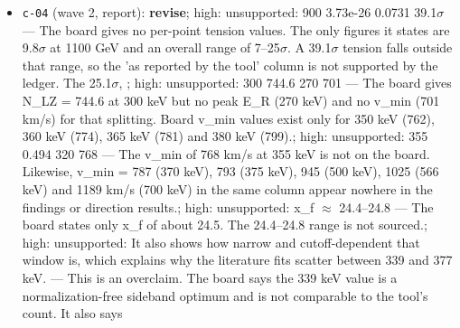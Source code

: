 \documentclass[11pt,a4paper]{article}
\begin{document}
\begin{itemize}
  \item \texttt{c-04} (wave 2, report): \textbf{revise}; high: unsupported: \textbar{} 900 \textbar{} 3.73e-26 \textbar{} 0.0731 \textbar{} 39.1$\sigma$ \textbar{} --- The board gives no per-point tension values. The only figures it states are 9.8$\sigma$ at 1100 GeV and an overall range of 7--25$\sigma$. A 39.1$\sigma$ tension falls outside that range, so the 'as reported by the tool' column is not supported by the ledger. The 25.1$\sigma$, ; high: unsupported: \textbar{} 300 \textbar{} 744.6 \textbar{} 270 \textbar{} 701 \textbar{} --- The board gives N\_LZ = 744.6 at 300 keV but no peak E\_R (270 keV) and no v\_min (701 km/s) for that splitting. Board v\_min values exist only for 350 keV (762), 360 keV (774), 365 keV (781) and 380 keV (799).; high: unsupported: \textbar{} 355 \textbar{} 0.494 \textbar{} 320 \textbar{} 768 \textbar{} --- The v\_min of 768 km/s at 355 keV is not on the board. Likewise, v\_min = 787 (370 keV), 793 (375 keV), 945 (500 keV), 1025 (566 keV) and 1189 km/s (700 keV) in the same column appear nowhere in the findings or direction results.; high: unsupported: x\_f $\approx$ 24.4--24.8 --- The board states only x\_f of about 24.5. The 24.4--24.8 range is not sourced.; high: unsupported: It also shows how narrow and cutoff-dependent that window is, which explains why the literature fits scatter between 339 and 377 keV. --- This is an overclaim. The board says the 339 keV value is a normalization-free sideband optimum and is not comparable to the tool's count. It also says
\end{itemize}
\end{document}

